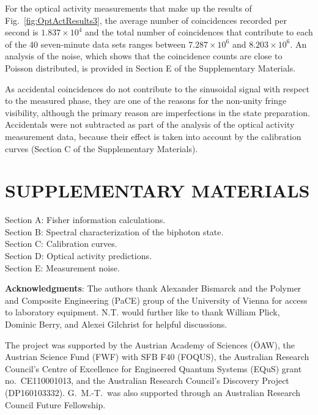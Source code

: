 \documentclass[12pt,preprint]{revtex4}
\begin{document}
For the optical activity measurements that make up the results of Fig.\ \ref{fig:OptActResults3}, the average number of coincidences recorded per second is $1.837\times 10^4$ and the total number of coincidences that contribute to each of the 40 seven-minute data sets ranges between $7.287\times 10^6$  and $8.203\times 10^6$. An analysis of the noise, which shows that the coincidence counts are close to Poisson distributed, is provided in Section E of the Supplementary Materials. 

As accidental coincidences do not contribute to the sinusoidal signal with respect to the measured phase, they are one of the reasons for the non-unity fringe visibility, although the primary reason are imperfections in the state preparation. Accidentals were not subtracted as part of the analysis of the optical activity measurement data, because their effect is taken into account by the calibration curves (Section C of the Supplementary Materials). 

\nocite{Crespi2012}
\nocite{Lowry1924}

\section*{SUPPLEMENTARY MATERIALS} \nonumber \label{SIlist}
\noindent Section A: Fisher information calculations.\\
Section B: Spectral characterization of the biphoton state.\\
Section C: Calibration curves.\\
Section D: Optical activity predictions.\\
Section E: Measurement noise.

%

\vspace{1cm}

\noindent \textbf{Acknowledgments}: The authors thank Alexander Bismarck and the Polymer and Composite Engineering (PaCE) group of the University of Vienna for access to laboratory equipment. N.T. would further like to thank William Plick, Dominic Berry, and Alexei Gilchrist for helpful discussions.  

\noindent The project was supported by the Austrian Academy of Sciences (\"{O}AW), the Austrian Science Fund (FWF) with SFB F40 (FOQUS), the Australian Research Council's Centre of Excellence for Engineered Quantum
Systems (EQuS) grant no.\ CE110001013, and the Australian Research Council's Discovery
Project (DP160103332). G.\ M.-T.\ was also supported through an Australian Research Council Future Fellowship.
\end{document}
